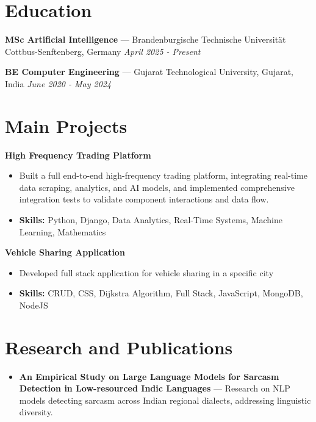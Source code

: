 \documentclass[a4paper,10pt]{article}
\begin{document}
\section*{Education}
\textbf{MSc Artificial Intelligence} — Brandenburgische Technische Universität Cottbus-Senftenberg, Germany \hfill \textit{April 2025 - Present}\par
\vspace{1.5pt}
\textbf{BE Computer Engineering} — Gujarat Technological University, Gujarat, India \hfill \textit{June 2020 - May 2024}\par

\section*{Main Projects}
\textbf{High Frequency Trading Platform}\par
\vspace{1pt}
\begin{itemize}
  \item Built a full end-to-end high-frequency trading platform, integrating real-time data scraping, analytics, and AI models, and implemented comprehensive integration tests to validate component interactions and data flow.
  \item \textbf{Skills:} Python, Django, Data Analytics, Real-Time Systems, Machine Learning, Mathematics
\end{itemize}
\vspace{3pt}
\textbf{Vehicle Sharing Application}\par
\vspace{1pt}
\begin{itemize}
  \item Developed full stack application for vehicle sharing in a specific city
  \item \textbf{Skills:} CRUD, CSS, Dijkstra Algorithm, Full Stack, JavaScript, MongoDB, NodeJS
\end{itemize}

\section*{Research and Publications}
\begin{itemize}
\item \textbf{An Empirical Study on Large Language Models for Sarcasm Detection in Low-resourced Indic Languages} — Research on NLP models detecting sarcasm across Indian regional dialects, addressing linguistic diversity.
\end{itemize}
\end{document}
